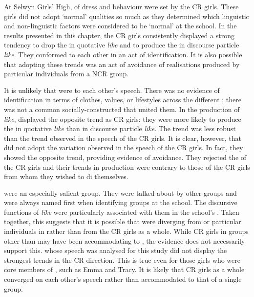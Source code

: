 At Selwyn Girls' High,  of dress and behaviour were set by the CR girls. These girls did not adopt `normal' qualities so much as they determined which linguistic and non-linguistic factors were considered to be `normal' at the school. In the results presented in this chapter, the CR girls consistently displayed a strong tendency to drop the  in quotative \textit{like} and to produce the  in discourse particle \textit{like}. They conformed to each other in an act of identification. It is also possible that adopting these trends was an act of avoidance of realisations produced by particular individuals from a NCR group.

It is unlikely that  were  to each other's speech. There was no evidence of identification in terms of clothes, values, or life\-styles across the different ; there was not a common so\-cially-con\-structed  that united them. In the production of \textit{like},  displayed the opposite trend as CR girls: they were more likely to produce the  in quotative \textit{like} than in discourse particle \textit{like}. The trend was less robust than the trend observed in the speech of the CR girls. It is clear, however, that  did not adopt the variation observed in the speech of the CR girls. In fact, they showed the opposite trend, providing evidence of avoidance. They rejected the  of the CR girls and their trends in production were contrary to those of the CR girls from whom they wished to di themselves. 

 were an especially salient group. They were talked about by other groups and were always named first when identifying groups at the school. The discursive functions of \textit{like} were particularly associated with them in the school's . Taken together, this suggests that it is possible that  were diverging from  or particular individuals in  rather than from the CR girls as a whole. While CR girls in groups other than  may have been accommodating to , the evidence does not necessarily support this.  whose speech was analysed for this study did not display the strongest trends in the CR direction. This is true even for those girls who were core members of , such as Emma and Tracy. It is likely that CR girls as a whole converged on each other's speech rather than accommodated to that of a single group.

